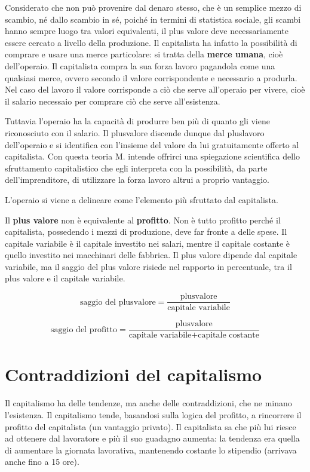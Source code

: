 \documentclass[a4paper, twoside, titlepage]{book}
\begin{document}
Considerato che non può provenire dal denaro stesso, che è un semplice mezzo di scambio, né dallo scambio in sé, poiché in termini di statistica sociale, gli scambi hanno sempre luogo tra valori equivalenti, il plus valore deve necessariamente essere cercato a livello della produzione. Il capitalista ha infatto la possibilità di comprare e usare una merce particolare: si tratta della \textbf{merce umana}, cioè dell'operaio.
Il capitalista compra la sua forza lavoro pagandola come una qualsiasi merce, ovvero secondo il valore corrispondente e necessario a produrla. Nel caso del lavoro il valore corrisponde a ciò che serve all'operaio per vivere, cioè il salario necessaio per comprare ciò che serve all'esistenza.

Tuttavia l’operaio ha la capacità di produrre  ben più di quanto gli viene riconosciuto con il salario.
Il plusvalore discende dunque dal  pluslavoro dell’operaio e si identifica con l’insieme del valore da lui  gratuitamente offerto al capitalista.
Con questa teoria M. intende offrirci una spiegazione scientifica dello sfruttamento capitalistico che egli interpreta con la possibilità, da parte dell’imprenditore, di utilizzare la forza lavoro altrui a proprio vantaggio.

L’operaio si viene a delineare come l’elemento più sfruttato dal capitalista.

Il \textbf{plus valore} non è equivalente al \textbf{profitto}. Non è tutto profitto perché il capitalista, possedendo i mezzi di produzione, deve far fronte a delle spese.
Il capitale variabile è il capitale investito nei salari, mentre il capitale costante è quello investito nei macchinari delle fabbrica.
Il plus valore dipende dal capitale variabile, ma il saggio del plus valore risiede nel rapporto in percentuale, tra il plus valore e il capitale variabile.

\[\text{saggio del plusvalore}=\frac{\text{plusvalore}}{\text{capitale variabile}}\]

\[\text{saggio del profitto}=\frac{\text{plusvalore}}{\text{capitale variabile}+\text{capitale costante}}\]

\section{Contraddizioni del capitalismo}

Il capitalismo ha delle tendenze, ma anche delle contraddizioni, che ne minano l’esistenza.
Il capitalismo tende, basandosi sulla logica del profitto, a rincorrere il profitto del capitalista (un vantaggio privato). Il capitalista sa che più lui riesce ad ottenere dal lavoratore e più il suo guadagno aumenta: la tendenza era quella di aumentare la giornata lavorativa, mantenendo costante lo stipendio (arrivava anche fino a 15 ore).
\end{document}
